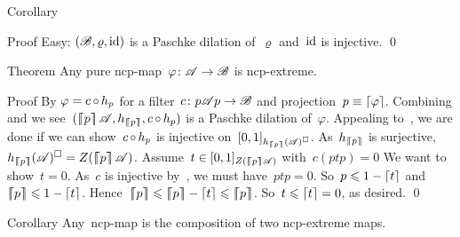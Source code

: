 \documentclass[b]{subfiles}
\begin{document}
\begin{parsec}
\begin{point}{Corollary}
\begin{point}{Proof}
Easy: $(\mathscr{B}, \varrho, \operatorname{id})$ is a Paschke dilation of~$\varrho$
and~$\operatorname{id}$ is injective.  \qed
\end{point}
\end{point}
\begin{point}{Theorem}%
Any pure ncp-map~$\varphi\colon \mathscr{A} \to \mathscr{B}$ is ncp-extreme.
\begin{point}{Proof}%
By  $\varphi = c \mathop{\circ} h_p$
    for a filter~$c\colon p\mathscr{A} p \to \mathscr{B}$
    and projection~$p \equiv \left\lceil\varphi\right\rceil$.
    Combining  and 
    we see~$(\cceil{p}\scrA, h_{\cceil{p}}, c\after h_p)$
    is a Paschke dilation of~$\varphi$.
Appealing to~,
    we are done if we can show~$c \mathop{\circ} h_p$
    is injective on~$[0,1]_{h_{\left\lceil\!\!\left\lceil p\right\rceil\!\!\right\rceil}(\mathscr{A})^\square}$.
As~$h_{\left\lceil\!\!\left\lceil p\right\rceil\!\!\right\rceil}$ is surjective,
    $h_{\cceil{p}}(\scrA)^\square = Z(\cceil{p} \scrA)$.
    Assume~$t \in [0,1]_{Z(\left\lceil\!\!\left\lceil p\right\rceil\!\!\right\rceil \mathscr{A})}$ with~$c(ptp)=0$
We want to show~$t = 0$.
As~$c$ is injective by~,
        we must have~$ptp = 0$.
So~$p \leqslant 1- \left\lceil t\right\rceil$
and~$\left\lceil\!\!\left\lceil p\right\rceil\!\!\right\rceil \leqslant 1- \left\lceil t\right\rceil$.
Hence~$\cceil{p} \leq \cceil{p} - \ceil{t} \leq \cceil{p}$.
So~$t \leqslant \left\lceil t \right\rceil=0$, as desired. \qed
\end{point}
\end{point}
\begin{point}{Corollary}%
    Any~ncp-map is the composition of two ncp-extreme maps.
\end{point}
\end{parsec}
\end{document}
